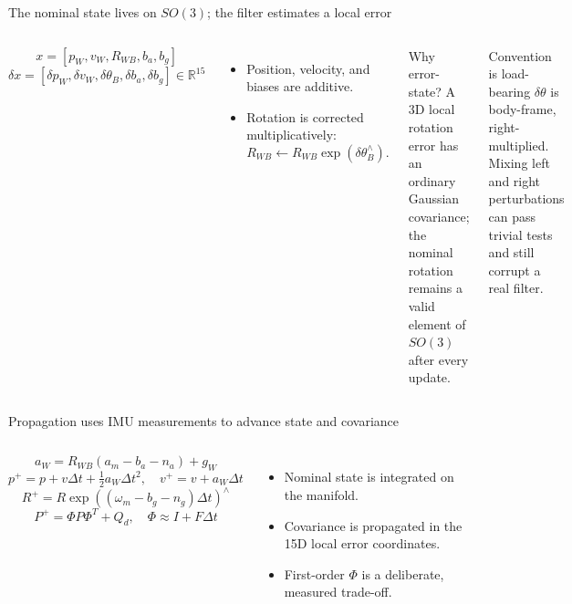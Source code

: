 \documentclass[10pt,aspectratio=169]{beamer}
\begin{document}
\begin{frame}{The nominal state lives on $SO(3)$; the filter estimates a local error}
  \begin{columns}[T]
    \[
      x = \left[p_W, v_W, R_{WB}, b_a, b_g\right]
    \]
    \[
      \delta x = \left[\delta p_W, \delta v_W, \delta\theta_B, \delta b_a, \delta b_g\right] \in \mathbb{R}^{15}
    \]
    \begin{itemize}
      \item Position, velocity, and biases are additive.
      \item Rotation is corrected multiplicatively:
      \[R_{WB} \leftarrow R_{WB}\exp(\delta\theta_B^\wedge).\]
    \end{itemize}
    \begin{block}{Why error-state?}
      A 3D local rotation error has an ordinary Gaussian covariance; the nominal rotation remains a valid element of $SO(3)$ after every update.
    \end{block}
    \begin{alertblock}{Convention is load-bearing}
      $\delta\theta$ is body-frame, right-multiplied. Mixing left and right perturbations can pass trivial tests and still corrupt a real filter.
    \end{alertblock}
  \end{columns}
\end{frame}

\begin{frame}{Propagation uses IMU measurements to advance state and covariance}
  \begin{columns}[T]
    \[
      a_W = R_{WB}(a_m-b_a-n_a)+g_W
    \]
    \[
      p^+ = p + v\Delta t + \tfrac12a_W\Delta t^2,\quad v^+=v+a_W\Delta t
    \]
    \[
      R^+=R\exp((\omega_m-b_g-n_g)\Delta t)^\wedge
    \]
    \[
      P^+ = \Phi P\Phi^T + Q_d,\quad \Phi\approx I+F\Delta t
    \]
    \begin{itemize}
      \item Nominal state is integrated on the manifold.
      \item Covariance is propagated in the 15D local error coordinates.
      \item First-order $\Phi$ is a deliberate, measured trade-off.
    \end{itemize}
  \end{columns}
\end{frame}
\end{document}
